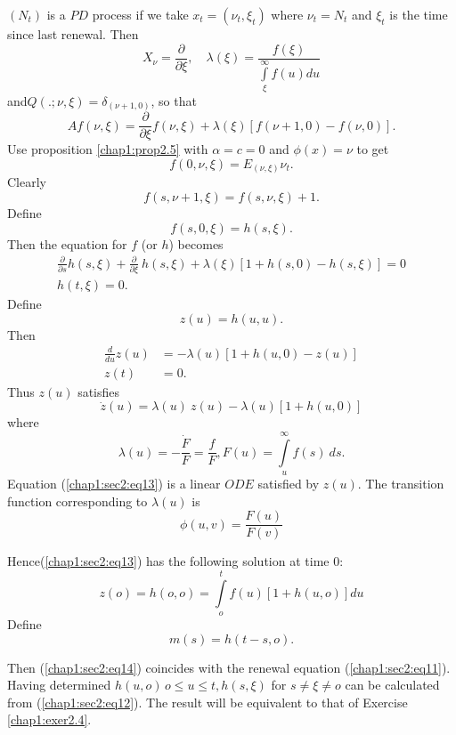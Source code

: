 $(N_t)$ is a $PD$ process if we take $x_t = (\nu_t,\xi_t)$ where
$\nu_t = N_t$ and $\xi_t$ is the time since last renewal. Then 
$$
X_\nu = \frac{\partial}{\partial \xi},\quad \lambda(\xi) =
\frac{f(\xi)}{\int\limits^\infty_\xi f(u)du} 
$$
and\pageoriginale $Q(.; \nu, \xi) = \delta_{(\nu + 1,0)}$, so that 
$$
Af(\nu,\xi) = \frac{\partial}{\partial \xi} f(\nu,\xi) +
\lambda(\xi)[f(\nu + 1,0) - f(\nu,0)]. 
$$
Use proposition \ref{chap1:prop2.5} with $\alpha = c = 0$ and $\phi(x)
= \nu$ to get  
$$
f(0,\nu,\xi) = E_{(\nu,\xi)} \nu_t.
$$
Clearly 
$$
f(s,\nu + 1, \xi) = f(s,\nu,\xi ) + 1.
$$
Define
$$
f(s,0,\xi) = h(s,\xi).
$$
Then the equation for $f$ (or $h$) becomes
\begin{gather*}
  \frac{\partial}{\partial s} h(s,\xi ) +\frac{\partial}{\partial \xi}
  ~ h(s,\xi) + \lambda(\xi)[1+h(s,0)-h(s,\xi )] = 0
  \tag{12}\label{chap1:sec2:eq12} \\  
  h(t,\xi ) = 0.  
\end{gather*}
Define
$$
z(u)= h(u,u).
$$
Then
\begin{align*}
\frac{d}{du} z(u) & = -\lambda(u)[1+h(u,0) - z(u)]\\
z(t) & = 0.
\end{align*}
Thus $z(u)$ satisfies
\begin{equation*}
\dot{z}(u) = \lambda(u) ~ z(u) -\lambda(u) [1 +
  h(u,0)]\tag{13}\label{chap1:sec2:eq13} 
\end{equation*}
where
$$
\lambda(u) = - \frac{\dot{F}}{F} = \frac{f}{F}, F(u) =
\int\limits^\infty_u f(s) ~ ds. 
$$
Equation (\ref{chap1:sec2:eq13}) is a linear $ODE$ satisfied by
$z(u)$. The transition function corresponding to $\lambda(u)$ is   
$$
\phi(u,v) = \frac{F(u)}{F(v)}
$$

Hence\pageoriginale (\ref{chap1:sec2:eq13}) has the following solution
at time 0: 
\begin{equation*}
  z(o) = h(o,o) = \int\limits_o^t
  f(u)[1+h(u,o)]du\tag{14}\label{chap1:sec2:eq14} 
\end{equation*}
Define
$$
m(s) = h(t - s,o).
$$

Then (\ref{chap1:sec2:eq14}) coincides with the renewal equation
(\ref{chap1:sec2:eq11}). Having determined $h(u,o)\, o \le u \le
t,h(s, \xi)$ for $s \neq \xi \neq o$ can be calculated from
(\ref{chap1:sec2:eq12}). The result will be equivalent to that of
Exercise \ref{chap1:exer2.4}.  


